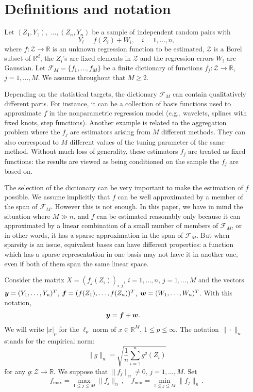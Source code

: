 \documentclass[dvips,aos]{imsart}
\numberwithin{equation}{section}
\theoremstyle{plain}
\def\Z{\mbox{$\mathcal Z$}}
\def\RR{\mathbb R}
\newcommand{\bmf}{\mbox{\boldmath$f$}}
\newcommand{\bmy}{\mbox{\boldmath$y$}}
\newcommand{\bmw}{\mbox{\boldmath$w$}}
\begin{document}
\section{Definitions and notation}\label{sec1}



Let $ (Z_1,Y_1),$ $\ldots,(Z_n,Y_n) $ be a sample of independent random
pairs with
\begin{equation*}
Y_i = f(Z_i) + W_i, \quad i=1,\ldots,n,
\end{equation*}
where $f:{\mathcal Z} \to \RR$ is an unknown regression function to
be estimated, ${\mathcal Z}$ is a Borel subset of $\RR^d$, the
$Z_i$'s are fixed elements in $\Z$ and the regression errors $W_i$
are Gaussian. Let $\mathcal{F}_M = \{f_1, \ldots, f_M\}$ be a finite
dictionary of functions $f_j:{\mathcal Z} \to \RR$, $j=1,\dots,M$.
We assume throughout that $M\ge2$.

Depending on the statistical targets, the dictionary $\mathcal{F}_M$
can contain qualitatively different parts. For instance, it can be a
collection of basis functions used to approximate $f$ in the
nonparametric regression model (e.g., wavelets, splines with fixed
knots, step functions). Another example is related to the
aggregation problem where the $f_j$ are estimators arising from $M$
different methods. They  can also correspond  to $M$ different
values of the tuning parameter of the same method. Without much loss
of generality, these estimators $f_j$ are treated as fixed
functions: the results are viewed as being conditioned on the sample
the $f_j$ are based on.

The selection of the dictionary can be very important to make the
estimation of $f$ possible.  We assume implicitly that $f$ can be
well approximated by a member of the span of $\mathcal{F}_M$.
However this is not enough.  In this paper, we have in mind the
situation where $M\gg n$, and $f$ can be estimated reasonably only
because it can approximated by a linear combination of a small
number of members of $\mathcal{F}_M$, or in other words, it has a
sparse approximation in the span of ${\mathcal{F}}_M$. But when
sparsity is an issue, equivalent bases can have different
properties: a function which has a sparse  representation in one
basis may not have it in another one, even if both of them span the
same linear space.

Consider the matrix $X= (f_j(Z_i))_{i,j}$, $i=1,\dots,n$,
$j=1,\dots,M$ and the vectors  $\bmy=(Y_1,\dots,Y_n)^T$, ${\bmf
}=(f(Z_1),\dots,f(Z_n))^T$, $\bmw=(W_1,\dots,W_n)^T$.  With this
notation,
\begin{eqnarray*}
\bmy &= {\bmf} +\bmw.
\end{eqnarray*} We will write
$|x|_p$ for the $\ell_p$ norm of $x\in\RR^M$, $1\le p\le\infty$. The notation  $\|\cdot\|_n$ stands for the empirical norm:
$$\|g\|_n= \sqrt{\frac1n \sum_{i=1}^n g^2(Z_i)}$$
for any $g:\mathcal Z\to\RR$. We suppose that $\|f_j\|_n\neq 0$, $j=1,\dots, M$.
Set
$$
f_{\max} = \max_{1\le j\le M} \|f_j\|_n\,, \quad f_{\min}= \min_{1\le j\le M} \|f_j\|_n\,.
$$
\end{document}
